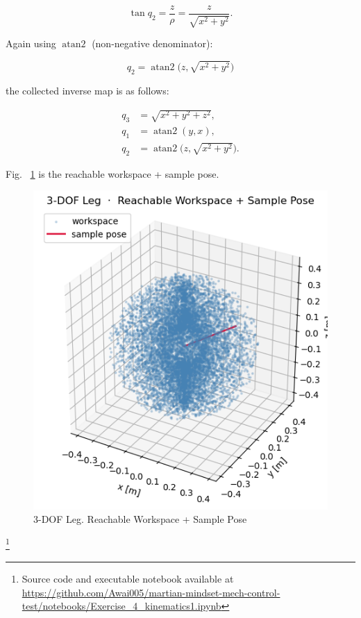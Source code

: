 \documentclass[12pt,a4paper]{article}
\begin{document}
\[
\tan q_{2}=\frac{z}{\rho}
          =\frac{z}{\sqrt{x^{2}+y^{2}}}.
\]

Again using \(\operatorname{atan2}\) (non-negative denominator):

\[
q_{2}=\operatorname{atan2}\!\bigl(z,\sqrt{x^{2}+y^{2}}\bigr)
\]

the collected inverse map is as follows:

\[
\boxed{
\begin{aligned}
q_{3} &= \sqrt{x^{2}+y^{2}+z^{2}},\\[4pt]
q_{1} &= \operatorname{atan2}(y,x),\\[4pt]
q_{2} &= \operatorname{atan2}\!\bigl(z,\sqrt{x^{2}+y^{2}}\bigr).
\end{aligned}}
\]

Fig. ~\ref{fig:robotic leg} is the reachable workspace + sample pose.
\begin{figure}[htbp]
  \centering
  \includegraphics[width=0.9\linewidth]{../figs/exercise_4.png}
  \caption{3-DOF Leg. Reachable Workspace + Sample Pose}
  \label{fig:robotic leg}
\end{figure}

\footnote{Source code and executable notebook available at
\url{https://github.com/Awai005/martian-mindset-mech-control-test/notebooks/Exercise_4_kinematics1.ipynb}}
\end{document}

